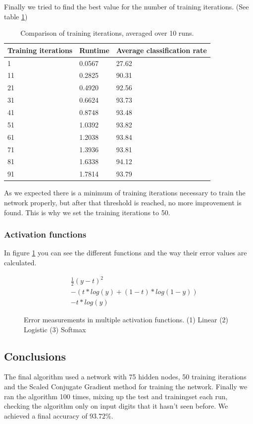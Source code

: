 \documentclass{article}
\begin{document}
Finally we tried to find the best value for the number of training iterations. (See table \ref{tab:trainiter})
\begin{table}[H]
	\centering
	\begin{tabular}{| l | l | l |}
		\hline
		Training iterations & Runtime & Average classification rate \\ \hline

            1 &   0.0567  &  27.62 \\ \hline
           11 &   0.2825  & 90.31 \\ \hline
           21 &   0.4920  & 92.56 \\ \hline

           31 &   0.6624  & 93.73\\ \hline
           41 &   0.8748  & 93.48 \\ \hline
           51 &   1.0392  & 93.82 \\ \hline

           61 &   1.2038  & 93.84 \\ \hline
           71 &   1.3936  & 93.81 \\ \hline
           81 &   1.6338  & 94.12 \\ \hline
           91 &   1.7814  & 93.79 \\ \hline
	\end{tabular}
	\caption{Comparison of training iterations, averaged over 10 runs.}
	\label{tab:trainiter}
\end{table}

As we expected there is a minimum of training iterations necessary to train the network properly, but after that threshold is reached, no more improvement is found. This is why we set the training iterations to 50.

\subsubsection{Activation functions}
In figure \ref{fig:errormeasure} you can see the different functions and the way their error values are calculated.

\begin{figure}[H]
	\centering
	\begin{eqnarray}
		&& \frac{1}{2}(y - t)^2 \\
		&&-(t * log(y) + (1 - t) * log(1 - y)) \\
		&& -t * log(y)
	\end{eqnarray}
	\caption{Error measurements in multiple activation functions. (1) Linear (2) Logistic (3) Softmax }
    \label{fig:errormeasure}
\end{figure}

\subsection{Conclusions}
The final algorithm used a network with 75 hidden nodes, 50 training iterations and the Scaled Conjugate Gradient method for training the network. Finally we ran the algorithm 100 times, mixing up the test and trainingset each run, checking the algorithm only on input digits that it hasn't seen before. We achieved a final accuracy of $93.72\%$.
\end{document}
